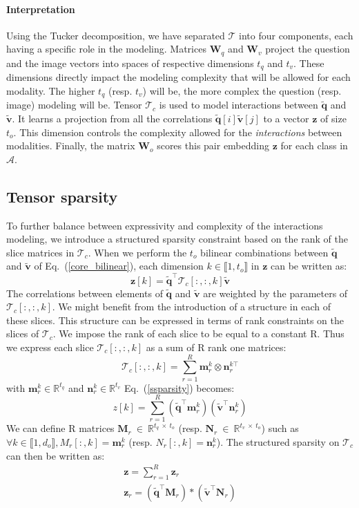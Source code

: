 \documentclass[10pt,twocolumn,letterpaper]{article}
\newcommand{\tens}[1]{
\bm{\mathcal{#1}}
}
\newcommand{\mat}[1]{\bm{#1}}
\newcommand{\z}{\mathbf{z}}
\newcommand{\tq}{\mathbf{\tilde{q}}}
\newcommand{\tv}{\mathbf{\tilde{v}}}
\begin{document}
\paragraph{Interpretation}
Using the Tucker decomposition, we have separated $\tens{T}$ into four components, each having a specific role in the modeling. Matrices $\mat{W}_q$ and $\mat{W}_v$ project the question and the image vectors into spaces of respective dimensions $t_q$ and $t_v$. These dimensions directly impact the modeling complexity that will be allowed for each modality. The higher $t_q$ (resp. $t_v$) will be, the more complex the question (resp. image) modeling will be. Tensor $\tens{T}_c$ is used to model interactions between $\tq$ and $\tv$. It learns a projection from all the correlations $\tq[i] \tv[j]$ to a vector $\z$ of size $t_o$. This dimension controls the complexity allowed for the \emph{interactions} between modalities. Finally, the matrix $\mat{W}_o$ scores this pair embedding $\z$ 
for each class in $\mathcal{A}$.

\subsection{Tensor sparsity} \label{section:ssparsity}
To further balance between expressivity and complexity of the interactions modeling, we introduce a structured sparsity constraint based on the rank of the slice matrices in $\tens{T}_c$.
When we perform the $t_o$ bilinear combinations between $\tq$ and $\tv$ of Eq.~(\ref{core_bilinear}), each dimension $k \in \llbracket 1,t_o \rrbracket$ in $\z$ can be written as:
\begin{equation}
\z[k] = \tq^\top \tens{T}_c[:,:,k] \tv
 \label{ssparsity}
\end{equation}
The correlations between elements of $\tq$ and $\tv$ are weighted by the  parameters of $\tens{T}_c[:,:,k]$. We might benefit from the introduction of a structure in each of these slices. This structure can be expressed in terms of rank constraints on the slices of $\tens{T}_c$. We impose the rank of each slice to be equal to a constant R. Thus we express each slice $\tens{T}_c[:,:,k]$ as a sum of R rank one matrices:
\begin{equation}
\tens{T}_c[:,:,k] = \sum_{r=1}^R \mathbf{m}_r^k \otimes \mathbf{n}_r^{k\top}
\end{equation}
with $\mathbf{m}_r^k \in \mathbb{R}^{t_q}$ and $\mathbf{n}_r^k \in \mathbb{R}^{t_v}$
Eq.~(\ref{ssparsity}) becomes:
\begin{equation}
z[k] = \sum_{r=1}^R \left( \tq^\top \mathbf{m}_r^k \right) \left( \tv^\top \mathbf{n}_r^k \right)
\end{equation}
We can define R matrices $\mat{M}_r~\in~\mathbb{R}^{t_q~\times~t_o}$ (resp. $\mat{N}_r~\in~\mathbb{R}^{t_v~\times~t_o}$) such as $\forall k \in \llbracket 1, d_o \rrbracket, M_r[:,k] = \mathbf{m}_r^k$ (resp. $N_r[:,k] = \mathbf{n}_r^k$). The structured sparsity on $\tens{T}_c$ can then be written as:
\begin{gather}
\z = \sum_{r=1}^R \z_r \\
\z_r = (\tq^\top \mat{M}_r) \ast (\tv^\top \mat{N}_r )
\end{gather}
\end{document}
